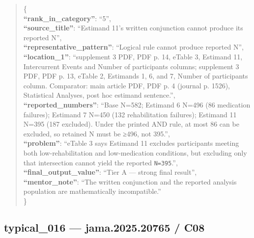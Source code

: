 \documentclass[
  letterpaper,
  9pt]{extreport}
\begin{document}
\begin{quote}
\{\\
\textbf{``rank\_in\_category''}: ``5'',\\
\textbf{``source\_title''}: ``Estimand 11's written conjunction cannot
produce its reported N'',\\
\textbf{``representative\_pattern''}: ``Logical rule cannot produce
reported N'',\\
\textbf{``location\_1''}: ``supplement 3 PDF, PDF p. 14, eTable 3,
Estimand 11, Intercurrent Events and Number of participants columns;
supplement 3 PDF, PDF p. 13, eTable 2, Estimands 1, 6, and 7, Number of
participants column. Comparator: main article PDF, PDF p. 4 (journal p.
1526), Statistical Analyses, post hoc estimand sentence.'',\\
\textbf{``reported\_numbers''}: ``Base N=582; Estimand 6 N=496 (86
medication failures); Estimand 7 N=450 (132 rehabilitation failures);
Estimand 11 N=395 (187 excluded). Under the printed AND rule, at most 86
can be excluded, so retained N must be ≥496, not 395.'',\\
\textbf{``problem''}: ``eTable 3 says Estimand 11 excludes participants
meeting both low-rehabilitation and low-medication conditions, but
excluding only that intersection cannot yield the reported
\texttt{N=395}.'',\\
\textbf{``final\_output\_value''}: ``Tier A --- strong final result'',\\
\textbf{``mentor\_note''}: ``The written conjunction and the reported
analysis population are mathematically incompatible.''\\
\}
\end{quote}

\hypertarget{typical_016--jama202520765--c08}{%
\subsection{typical\_016 --- jama.2025.20765 /
C08}\label{typical_016--jama202520765--c08}}
\end{document}

